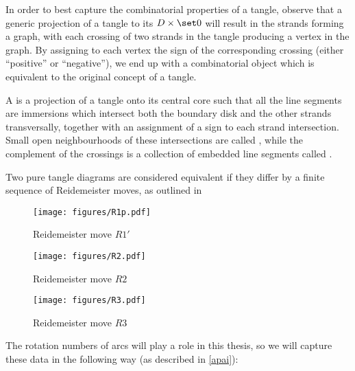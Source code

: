 In order to best capture the combinatorial properties of a tangle, observe that
a generic projection of a tangle to its  $D\times \set 0$
will result in the strands forming a graph, with each crossing of two strands in
the tangle producing a vertex in the graph. By assigning to each vertex the sign
of the corresponding crossing (either \enquote{positive} or \enquote{negative}),
we end up with a combinatorial object which is equivalent to the original
concept of a tangle.

\begin{definition}\label{def:pure_tangle_diagram}
        A  is a projection of a tangle onto its
        central core such that all the line segments are immersions which
        intersect both the boundary disk and the other strands transversally,
        together with an assignment of a sign to each strand intersection.
        Small open neighbourhoods of these intersections are called
        , while the complement of the crossings is a collection
        of embedded line segments called .

        Two pure tangle diagrams are considered equivalent if they differ by a
        finite sequence of Reidemeister moves, as outlined in
\end{definition}

\begin{figure}[h]
        \centering
        \texttt{[image: figures/R1p.pdf]}
        \caption{Reidemeister move $R1'$}
        \label{fig:R1p}
\end{figure}
\begin{figure}[h]
        \centering
        \texttt{[image: figures/R2.pdf]}
        \caption{Reidemeister move $R2$}
        \label{fig:R2}
\end{figure}
\begin{figure}[h]
        \centering
        \texttt{[image: figures/R3.pdf]}
        \caption{Reidemeister move $R3$}
        \label{fig:R3}
\end{figure}

The rotation numbers of arcs will play a role in this thesis, so we will capture
these data in the following way (as described in \cref{apai}):


